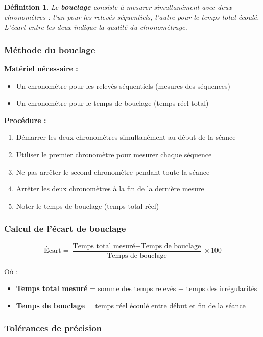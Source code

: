\documentclass[a4paper,12pt]{article}
\newtheorem{definition}{Définition}[section]
\begin{document}
\begin{definition}
Le \textbf{bouclage} consiste à mesurer simultanément avec deux chronomètres : l'un pour les relevés séquentiels, l'autre pour le temps total écoulé. L'écart entre les deux indique la qualité du chronométrage.
\end{definition}

\subsubsection{Méthode du bouclage}

\textbf{Matériel nécessaire :}
\begin{itemize}
    \item Un chronomètre pour les relevés séquentiels (mesures des séquences)
    \item Un chronomètre pour le temps de bouclage (temps réel total)
\end{itemize}

\textbf{Procédure :}
\begin{enumerate}
    \item Démarrer les deux chronomètres simultanément au début de la séance
    \item Utiliser le premier chronomètre pour mesurer chaque séquence
    \item Ne pas arrêter le second chronomètre pendant toute la séance
    \item Arrêter les deux chronomètres à la fin de la dernière mesure
    \item Noter le temps de bouclage (temps total réel)
\end{enumerate}

\subsubsection{Calcul de l'écart de bouclage}

\[
\text{Écart} = \frac{\text{Temps total mesuré} - \text{Temps de bouclage}}{\text{Temps de bouclage}} \times 100
\]

Où :
\begin{itemize}
    \item \textbf{Temps total mesuré} = somme des temps relevés + temps des irrégularités
    \item \textbf{Temps de bouclage} = temps réel écoulé entre début et fin de la séance
\end{itemize}

\subsubsection{Tolérances de précision}
\end{document}
